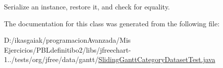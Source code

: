 Serialize an instance, restore it, and check for equality. 

The documentation for this class was generated from the following file\+:\begin{DoxyCompactItemize}
\item 
D\+:/ikasgaiak/programacion\+Avanzada/\+Mis Ejercicios/\+P\+B\+Ldefinitibo2/libs/jfreechart-\/1../tests/org/jfree/data/gantt/\mbox{\hyperlink{_sliding_gantt_category_dataset_test_8java}{Sliding\+Gantt\+Category\+Dataset\+Test.\+java}}\end{DoxyCompactItemize}
